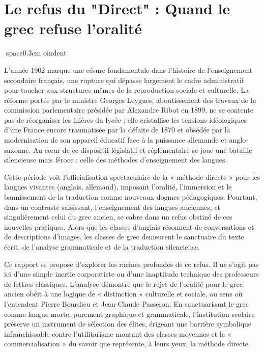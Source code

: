 

\section{Le refus du "Direct" : Quand le grec refuse l'oralité}
space{0.3cm}
oindent

L'année 1902 marque une césure fondamentale dans l'histoire de l'enseignement secondaire français,
une rupture qui dépasse largement le cadre administratif pour toucher aux structures mêmes de la
reproduction sociale et culturelle. La réforme portée par le ministre Georges Leygues, aboutissement
des travaux de la commission parlementaire présidée par Alexandre Ribot en 1899, ne se contente pas
de réorganiser les filières du lycée ; elle cristallise les tensions idéologiques d'une France
encore traumatisée par la défaite de 1870 et obsédée par la modernisation de son appareil éducatif
face à la puissance allemande et anglo-saxonne.\cite{I-2-2-ref1} Au cœur de ce dispositif législatif
et réglementaire se joue une bataille silencieuse mais féroce : celle des méthodes d'enseignement
des langues.

Cette période voit l'officialisation spectaculaire de la « méthode directe » pour les langues
vivantes (anglais, allemand), imposant l'oralité, l'immersion et le bannissement de la traduction
comme nouveaux dogmes pédagogiques.\cite{I-2-2-ref2} Pourtant, dans un contraste saisissant,
l'enseignement des langues anciennes, et singulièrement celui du grec ancien, se cabre dans un refus
obstiné de ces nouvelles pratiques. Alors que les classes d'anglais résonnent de conversations et de
descriptions d'images, les classes de grec demeurent le sanctuaire du texte écrit, de l'analyse
grammaticale et de la traduction silencieuse.

Ce rapport se propose d'explorer les racines profondes de ce refus. Il ne s'agit pas ici d'une
simple inertie corporatiste ou d'une inaptitude technique des professeurs de lettres classiques.
L'analyse démontre que le rejet de l'oralité pour le grec ancien obéit à une logique de «
distinction » culturelle et sociale, au sens où l'entendent Pierre Bourdieu et Jean-Claude
Passeron.\cite{I-2-2-ref4} En sanctuarisant le grec comme langue morte, purement graphique et
grammaticale, l'institution scolaire préserve un instrument de sélection des élites, érigeant une
barrière symbolique infranchissable contre l'utilitarisme montant des classes moyennes et la «
commercialisation » du savoir que représente, à leurs yeux, la méthode directe.

